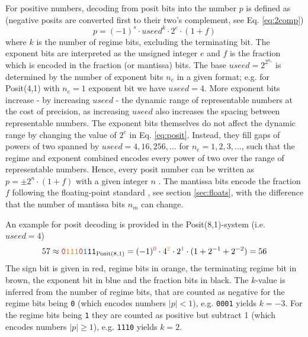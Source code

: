 For positive numbers, decoding from posit bits into the number $p$ is defined as
\citep{Gustafson2017a,Klower2019a,Chen2018} (negative posits are converted first to their two's complement, see
Eq. \ref{eq:2comp})
\begin{equation}
p = (-1)^s \cdot useed^k \cdot 2^e \cdot (1+f)
\label{eq:posit}
\end{equation}
where $k$ is the number of regime bits, excluding the terminating bit. The exponent bits are interpreted as the unsigned integer $e$
and $f$ is the fraction which is encoded in the fraction (or mantissa) bits. The base $useed = 2^{2^{n_e}}$ is
determined by the number of exponent bits $n_e$ in a given format; e.g. for Posit(4,1) with $n_e=1$ exponent bit we have $useed = 4$.
More exponent bits increase - by increasing $useed$ - the dynamic range of representable numbers at the cost of precision,
as increasing $useed$ also increases the spacing between representable numbers. The exponent bits themselves do
not affect the dynamic range by changing the value of $2^e$ in Eq. \ref{eq:posit}. Instead, they fill gaps of
powers of two spanned by $useed = 4,16,256,...$ for $n_e=1,2,3,...$, such that the regime and exponent combined
encodes every power of two over the range of representable numbers. Hence, every posit number can be written as
$p = \pm 2^n \cdot (1+f)$ with a given integer $n$ \citep{Gustafson2017a,Chen2018}. The mantissa bits encode the
fraction $f$ following the floating-point standard \citep{IEEE1985}, see section \ref{sec:floats}, with the difference that
the number of mantissa bits $n_m$ can change.

An example for posit decoding is provided in the Posit(8,1)-system (i.e. $useed = 4$)
\begin{equation}
57 \approx \mathtt{{\color{psign}0}{\color{pregime}111}{\color{pregimet}0}{\color{pexpo}1}11}_{\op{Posit}(8,1)} = (-1)^{\color{psign}0}
\cdot 4^{\color{pregime}2} \cdot 2^{\color{pexpo}1} \cdot (1+2^{-1}+2^{-2}) = 56
\label{eq:posit_pos}
\end{equation}
The sign bit is given in red, regime bits in orange, the terminating regime bit in brown, the exponent bit in blue and the fraction bits in black.
The $k$-value is inferred from the number of regime bits, that are counted as negative for the regime bits being \texttt{0}
(which encodes numbers $\vert p \vert <1$), e.g. \texttt{{\color{pregime}000}{\color{pregimet}1}} yields $k=-3$. For the regime bits being \texttt{1}
they are counted as positive but subtract 1 (which encodes numbers $\vert p \vert \geq 1$), e.g. \texttt{{\color{pregime}111}{\color{pregimet}0}}
yields $k=2$.

